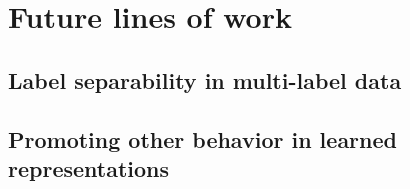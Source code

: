 \section{Future lines of work}

\subsection{Label separability in multi-label data}

\subsection{Promoting other behavior in learned representations}

